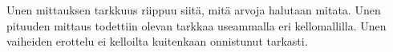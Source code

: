 \documentclass[utf8,bachelor,finnish]{bachelor}
\begin{document}
Unen mittauksen tarkkuus riippuu siitä, mitä arvoja halutaan mitata. Unen pituuden mittaus todettiin olevan tarkkaa useammalla eri kellomallilla.
 Unen vaiheiden erottelu ei kelloilta kuitenkaan onnistunut tarkasti.




\printbibliography
\end{document}

